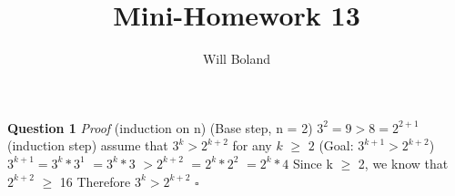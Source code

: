 \documentclass{article}
\begin{document}
\title{Mini-Homework 13}
\author{Will Boland}
\maketitle

\textbf{Question 1}\newline
\textit{Proof} (induction on n)\newline
(Base step, n = 2)\newline
${3^2 = 9 > 8 = 2^{2+1}}$\newline\newline
(induction step)\newline
assume that ${3^k > 2^{k+2}}$ for any ${k}$ $\geq$ ${2}$\newline
(Goal: ${3^{k+1}>2^{k+2}}$)\newline
${3^{k+1} = 3^k * 3^1}$\newline
${= 3^k * 3}$\newline
${> 2^{k + 2}}$\newline
${= 2^k * 2^2}$
${= 2^k * 4}$
Since k $\geq$ 2, we know that ${2^{k+2}}$ $\geq$ 16\newline
Therefore ${3^k > 2^{k+2}}$ $\square$

\enddocument
\end{document}
